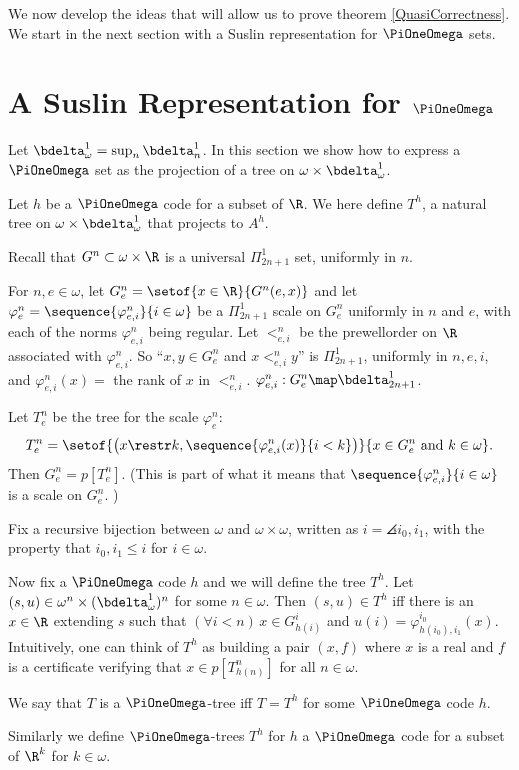 \documentclass[oneside,12pt]{amsart}
\begin{document}
We now develop the ideas that will allow us to prove theorem \ref{QuasiCorrectness}. We
start in the next section with a Suslin representation for $\PiOneOmega$ sets.

\section{A Suslin Representation for $\PiOneOmega$}
\label{section:suslinrep}

Let $\bdelta^1_{\omega} = \sup_n \bdelta^1_n$. In this section we show how to
express a $\PiOneOmega$ set as the projection
of a tree on $\omega\times \bdelta^1_{\omega}$.

\begin{definition}
Let $h$ be a $\PiOneOmega$ code for a subset of $\R$.
We here define $T^{h}$,  a natural tree  on $\omega\times\bdelta^1_{\omega}$ that projects to $A^h$.

Recall that $G^n\subset\omega\times\R$ is a universal $\Pi^1_{2n+1}$ set, uniformly in $n$.

For $n,e\in\omega$, let $G^n_e = \setof{x\in\R}{G^n(e, x)}$ and
let $\varphi^n_e = \sequence{\varphi^n_{e,i}}{i\in\omega}$ be a $\Pi^1_{2n+1}$ scale on $G^n_e$ uniformly in $n$ and $e$,
with each of the norms $\varphi^n_{e,i}$ being regular.
Let $<^n_{e,i}$ be the prewellorder on $\R$ associated with $\varphi^n_{e,i}$. So ``$x,y\in G^n_e$ and $x <^n_{e,i} y$'' is
$\Pi^1_{2n+1}$, uniformly in $n,e,i$, and $\varphi^n_{e,i}(x) = $ the rank of $x$ in $<^n_{e,i}$.
$\varphi^n_{e,i} : G^n_e \map \bdelta^1_{2n+1}$.

Let $T^n_e$ be the tree for the scale $\varphi^n_e$:
$$T^n_e = \setof{\left(x\restr k,\sequence{\varphi^n_{e,i}(x)}{i<k}\right)}{x\in G^n_e \text{ and } k\in\omega}.$$
Then $G^n_e=p[T^n_e]$. (This is part of what it means that 
$\sequence{\varphi^n_{e,i}}{i\in\omega}$ is a scale on $G^n_e$. )

Fix a recursive bijection between $\omega$ and $\omega\times\omega$, 
written as $i=\angles{i_0,i_1}$,
with the property that $i_0,i_1\leq i$ for $i\in\omega$.

Now fix a $\PiOneOmega$ code $h$ and we will define the tree $T^h$.
Let $(s,u) \in \omega^n\times(\bdelta^1_{\omega})^n$ for some $n\in\omega$. Then $(s,u)\in T^h$ iff there is an
$x\in\R$ extending $s$ such that $(\forall i<n)\, x\in G^{i}_{h(i)}$ and
$u(i)=\varphi^{i_0}_{h(i_0),i_1}(x)$. Intuitively, one can think of $T^h$ as building a pair $(x,f)$
where $x$ is a real and $f$ is a certificate verifying that $x\in p[T^n_{h(n)}]$ for all $n\in\omega$.

We say that $T$ is a $\PiOneOmega$-tree iff $T=T^h$ for some $\PiOneOmega$ code $h$.

Similarly we define $\PiOneOmega$-trees $T^h$ for $h$ a $\PiOneOmega$ code for a
subset of $\R^k$ for $k\in\omega$.
\end{definition}
\end{document}
